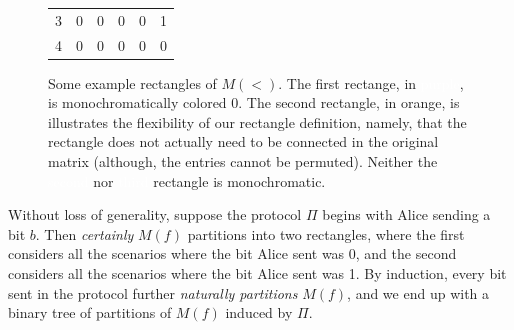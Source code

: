 \documentclass[12pt]{article}
\begin{document}
\begin{figure}[h]
\begin{minipage}{0.25\textwidth}
\begin{tabular}{|l|lllll|}
		3   & 0 & 0 & 0 & 0 & 1 \\
		4   & 0 & 0 & 0 & 0 & 0\\\hline
		\end{tabular}   
	\end{minipage}
	\caption{Some example rectangles of $M(<)$.  The first rectange, in {\colorbox{purple!75}{\textcolor{white}{purple}}}, is monochromatically colored 0.  The second rectangle, in {\colorbox{orange!75}{orange}}, is illustrates the flexibility of our rectangle definition, namely, that the rectangle does not actually need to be connected in the original matrix (although, the entries cannot be permuted).  Neither the {\colorbox{purple!75}{\textcolor{white}{second}}} nor {\colorbox{black!75}{\textcolor{white}{third}}} rectangle is monochromatic.}
\end{figure}

Without loss of generality, 
	suppose the protocol $\Pi$ begins with Alice
	sending a bit $b$.
Then \emph{certainly} $M(f)$ partitions into two rectangles,
	where the first considers all the scenarios where the bit Alice sent was 0,
	and the second considers all the scenarios where the bit Alice sent was 1.
By induction, every bit sent in the protocol further \emph{naturally partitions} $M(f)$,
and we end up with a binary tree of partitions of $M(f)$ induced by $\Pi$.

% 
% 
\end{document}
